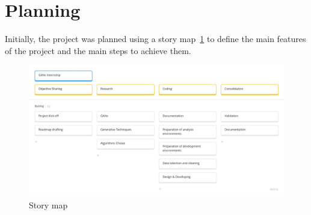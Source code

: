 \section{Planning}
Initially, the project was planned using a story map~\ref*{label:story-map} to define the main features of the project and the main steps to achieve them.
\begin{figure}[H]
    \centering
    \includegraphics[width=1\textwidth]{images/story-map.jpg}
    \caption{Story map}\label{label:story-map}
\end{figure}
